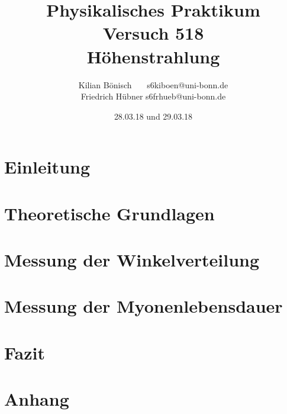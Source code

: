 \documentclass{article}
\newcommand{\RM}[1]{\MakeUppercase{\romannumeral #1}}
\begin{document}
\setlength{\parindent}{0em}   %
\title{Physikalisches Praktikum \RM{5}\\Versuch 518\\Höhenstrahlung}
\author{Kilian Bönisch \ \ \ \qquad s6kiboen@uni-bonn.de \\
  Friedrich Hübner \qquad s6frhueb@uni-bonn.de }
\date{28.03.18 und 29.03.18}

\maketitle
\thispagestyle{empty}

\newpage

\thispagestyle{empty}

\tableofcontents

\newpage

\section{Einleitung}



\section{Theoretische Grundlagen}



\newpage

\section{Messung der Winkelverteilung}





\section{Messung der Myonenlebensdauer}





\FloatBarrier
\section{Fazit}



\FloatBarrier

\newpage

\printbibliography

\newpage

\section{Anhang}


\end{document}
